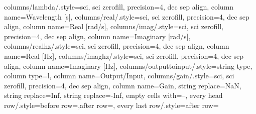 {columns/lambda/.style={sci, sci zerofill, precision=4, dec sep align, column name={Wavelength [s]}},
columns/real/.style={sci, sci zerofill, precision=4, dec sep align, column name={Real [rad/s]}},
columns/imag/.style={sci, sci zerofill, precision=4, dec sep align, column name={Imaginary [rad/s]}},
columns/realhz/.style={sci, sci zerofill, precision=4, dec sep align, column name={Real [Hz]}},
columns/imaghz/.style={sci, sci zerofill, precision=4, dec sep align, column name={Imaginary [Hz]}},
columns/outputtoinput/.style={string type, column type=l, column name={Output/Input}},
columns/gain/.style={sci, sci zerofill, precision=4, dec sep align, column name={Gain}},
string replace={NaN}{},
string replace={Inf}{},
string replace={-Inf}{},
empty cells with={--},
every head row/.style={before row=\toprule,after row=\midrule},
every last row/.style={after row=\bottomrule}}

